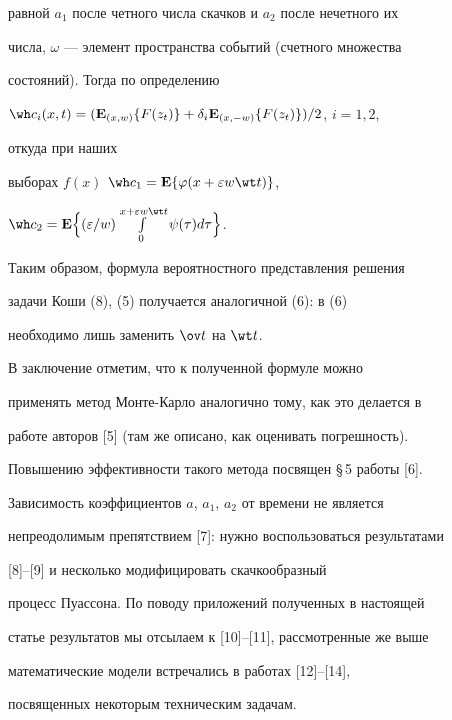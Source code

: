 равной $a_1$ после четного числа скачков и $a_2$ после нечетного их 


числа, $\omega$ --- элемент пространства событий (счетного множества 


состояний). Тогда по определению 


$\wh c_i(x,t)=(\bold E_{(x,w)}\{F(z_t)\}+\delta_i \bold 


E_{(x,-w)}\{F(z_t)\})/2$, $i=1,2$, 


откуда при наших 


выборах $f(x)$\; $\wh c_1=\bold E\{\varphi(x+\varepsilon w\wt t)\}$, 


$\wh c_2=\bold E\Big\{(\varepsilon/w) 


\int\limits^{x+\varepsilon w\wt t}_0\psi(\tau)d\tau\Big\}$. 


Таким образом, формула вероятностного представления решения 


задачи Коши (8), (5) получается аналогичной (6): в (6) 


необходимо лишь заменить $\ov t$ на $\wt t$. 


 


В заключение отметим, что к полученной формуле можно 


применять метод Монте-Карло аналогично тому, как это делается в 


работе авторов [5] (там же описано, как оценивать погрешность). 


Повышению эффективности такого метода посвящен \S\,5 работы [6]. 


Зависимость коэффициентов $a$, $a_1$, $a_2$ от времени не является 


непреодолимым препятствием [7]: нужно воспользоваться результатами 


[8]--[9] и несколько модифицировать скачкообразный 


процесс Пуассона. По поводу приложений полученных в настоящей 


статье результатов мы отсылаем к [10]--[11], рассмотренные же выше 


математические модели встречались в работах [12]--[14], 


посвященных некоторым техническим задачам. 


 


